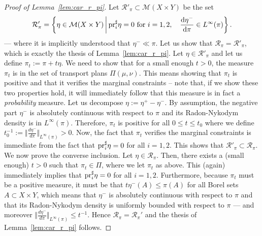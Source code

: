 \documentclass[leqno, 11pt, a4paper]{amsart}
\theoremstyle{definition}
\newcommand{\cR}{\mathcal{R}}
\newcommand{\cM}{\mathcal{M}}
\newcommand{\pr}{{\rm pr}}
\newcommand{\dd}{\mathrm{d}}
\begin{document}
\begin{proof}[Proof of Lemma~\ref{lem:car_r_pi}]
	Let $\cR'_\pi \subset \cM(X \times Y)$ be the set 
		\begin{equation}\label{eq:R_pi}
				\cR'_\pi = \left\{\eta \in \cM(X \times Y) \,\middle|\, \pr_i^\sharp \eta = 0 \text{ for }i = 1,2, \quad \frac{\dd \eta^-}{\dd \pi} \in L^\infty(\pi) \right\}.
		\end{equation}
		— where it is implicitly understood that $\eta^- \ll \pi$. Let us show that $\cR_\pi = \cR'_\pi$, which is exactly the thesis of Lemma~\ref{lem:car_r_pi}. Let $\eta \in \cR'_\pi$ and let us define $\pi_t := \pi + t \eta$. We need to show that for a small enough $t > 0$, the measure $\pi_t$ is in the set of transport plans $\Pi(\mu, \nu)$. This means showing that $\pi_t$ is positive and that it verifies the marginal constraints -- note that, if we show these two properties hold, it will immediately follow that this measure is in fact a \textit{probability} measure. Let us decompose $\eta := \eta^+ - \eta^-$. By assumption, the negative part $\eta^-$ is absolutely continuous with respect to $\pi$ and its Radon-Nykodym density is in $L^\infty(\pi)$. Therefore, $\pi_t$ is positive for all $0 \leq t \leq t_0$ where we define $t_0^{-1} := \Vert \frac{d \eta^-}{d \pi} \Vert_{L^\infty(\pi)} > 0$. Now, the fact that $\pi_t$ verifies the marginal constraints is immediate from the fact that $\pr_i^\sharp \eta = 0$ for all $i = 1, 2$. This shows that $\cR'_\pi \subset \cR_\pi$. We now prove the converse inclusion. Let $\eta \in \cR_\pi$. Then, there exists a (small enough) $t > 0$ such that $\pi_t \in \Pi$, where we let $\pi_t$ as above. This (again) immediately implies that $\pr_i^\sharp \eta = 0$ for all $i = 1, 2$. Furthermore, because $\pi_t$ must be a positive measure, it must be that $t \eta^-(A) \leq \pi(A)$ for all Borel sets $A \subset X \times Y$, which means that $\eta^-$ is absolutely continuous with respect to $\pi$ and that its Radon-Nykodym density is uniformly bounded with respect to $\pi$ — and moreover $\Vert \frac{d\eta^-}{d \pi} \Vert_{L^\infty(\pi)} \leq t^{-1}$. Hence $\cR_\pi = \cR_\pi'$ and the thesis of Lemma~\ref{lem:car_r_pi} follows.
	\end{proof}
\end{document}
